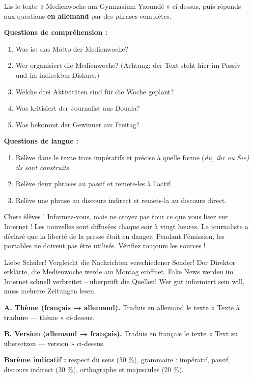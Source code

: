 \documentclass[11pt]{article}
\newcommand{\all}[1]{\ifmmode\text{\textit{#1}}\else\begingroup\selectlanguage{ngerman}\itshape #1\endgroup\fi}
\begin{document}
\begin{exercice}
Lis le texte « Medienwoche am Gymnasium Yaoundé » ci-dessus, puis réponds aux questions \textbf{en allemand} par des phrases complètes.

\textbf{Questions de compréhension :}
\begin{enumerate}
\item Was ist das Motto der Medienwoche?
\item Wer organisiert die Medienwoche? (Achtung: der Text steht hier im Passiv und im indirekten Diskurs.)
\item Welche drei Aktivitäten sind für die Woche geplant?
\item Was kritisiert der Journalist aus Douala?
\item Was bekommt der Gewinner am Freitag?
\end{enumerate}

\textbf{Questions de langue :}
\begin{enumerate}
\item Relève dans le texte trois impératifs et précise à quelle forme (\all{du}, \all{ihr} ou \all{Sie}) ils sont construits.
\item Relève deux phrases au passif et remets-les à l'actif.
\item Relève une phrase au discours indirect et remets-la au discours direct.
\end{enumerate}
\end{exercice}

\begin{textebox}
Chers élèves ! Informez-vous, mais ne croyez pas tout ce que vous lisez sur Internet ! Les nouvelles sont diffusées chaque soir à vingt heures. Le journaliste a déclaré que la liberté de la presse était en danger. Pendant l'émission, les portables ne doivent pas être utilisés. Vérifiez toujours les sources !
\end{textebox}

\begin{textebox}
Liebe Schüler! Vergleicht die Nachrichten verschiedener Sender! Der Direktor erklärte, die Medienwoche werde am Montag eröffnet. Fake News werden im Internet schnell verbreitet – überprüft die Quellen! Wer gut informiert sein will, muss mehrere Zeitungen lesen.
\end{textebox}

\begin{exercice}
\textbf{A. Thème (français → allemand).} Traduis en allemand le texte « Texte à traduire — thème » ci-dessus.

\textbf{B. Version (allemand → français).} Traduis en français le texte « Text zu übersetzen — version » ci-dessus.

\textbf{Barème indicatif :} respect du sens (50 \%), grammaire : impératif, passif, discours indirect (30 \%), orthographe et majuscules (20 \%).
\end{exercice}
\end{document}
